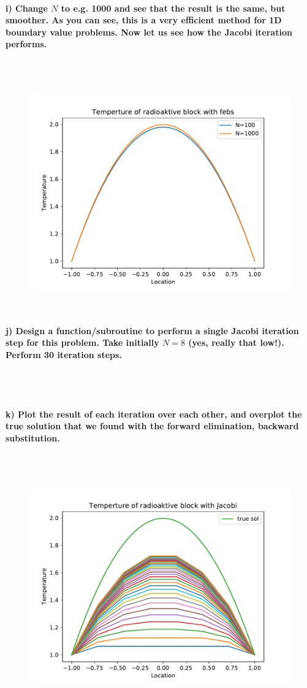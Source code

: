 \newpage
\paragraph{
    i) Change $N$ to e.g. 1000 and see that the result is the same, but
    smoother. As you can see, this is a very efficient method for 1D
    boundary value problems. Now let us see how the Jacobi iteration
    performs.
} \ \\
    \\
    \begin{figure}[h!]
	\centering
	\includegraphics[width=.7\textwidth]{../figures/Aufg1h.pdf}
\end{figure} \ \\

\newpage
\paragraph{
    j) Design a function/subroutine to perform a single Jacobi iteration
    step for this problem. Take initially $N=8$ (yes, really that low!).
    Perform 30 iteration steps.
} \ \\
    \\

\paragraph{
    k) Plot the result of each iteration over each other, and overplot
    the true solution that we found with the forward elimination,
    backward substitution.
} \ \\
    \\
    \begin{figure}[h!]
        \centering
        \includegraphics[width=.7\textwidth]{../figures/Aufg1k.pdf}
    \end{figure} \ \\


